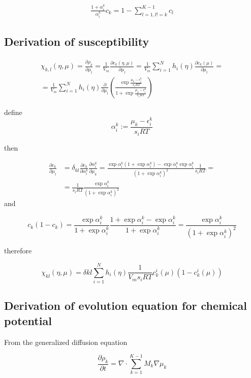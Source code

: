 \documentclass[11pt]{article}
\begin{document}
\begin{align*}
\frac{1+\alpha_i^k}{\alpha_i^k} c_k = 1-\sum_{l=1, l!=k}^{K-1} c_l
\end{align*}


\subsection{Derivation of susceptibility}
\label{sec:orga844052}

\begin{align*}
\chi_{k,l}(\eta, \mu) = \frac{\partial \rho_k}{\partial \mu_l} = \frac{1}{V_m} \frac{\partial c_k(\eta, \mu)}{\partial \mu_l} = \frac{1}{V_m} \sum_{i=1}^N h_i(\eta) \frac{\partial c_k(\mu)}{\partial \mu_l} = \\
 = \frac{1}{V_m} \sum_{i=1}^N h_i(\eta) \frac{\partial}{\partial \mu_l}\left( \frac{\exp{\frac{\mu_k - \epsilon^k_i}{s_i R T}}}{1 + \exp{\frac{\mu_k - \epsilon^k_i}{s_i R T}}} \right)
\end{align*}

define
$$
\alpha^k_i := \frac{\mu_k - \epsilon^k_i}{s_i R T}
$$

then

\begin{align*}
\frac{\partial c_k}{\partial \mu_l} &= \delta_{kl} \frac{\partial c_k}{\partial \alpha_i^k} \frac{\partial \alpha_i^k}{\partial \mu_k} = \frac{\exp{\alpha^k_i} (1+\exp{\alpha^k_i}) - \exp{\alpha^k_i} \exp{\alpha^k_i}}{(1+\exp{\alpha^k_i})^2} \frac{1}{s_i R T} = \\
&= \frac{1}{s_i R T} \frac{\exp{\alpha^k_i}}{(1+\exp{\alpha^k_i})^2}
\end{align*}
and

$$
c_k (1-c_k) = \frac{\exp{\alpha^k_i}}{1+\exp{\alpha^k_i}} \frac{1+\exp{\alpha^k_i} - \exp{\alpha^k_i}}{1+\exp{\alpha^k_i}} = \frac{\exp{\alpha^k_i}}{(1+\exp{\alpha^k_i})^2}
$$

therefore

$$
\chi_{kl}(\eta, \mu) = \delta{kl} \sum_{i=1}^N h_i(\eta) \frac{1}{V_m s_i R T} c^i_k(\mu) (1-c^i_k(\mu))
$$




\subsection{Derivation of evolution equation for chemical potential}
\label{sec:orgb8d1e50}

From the generalized diffusion equation

$$
\frac{\partial \rho_k}{\partial t} = \nabla \cdot \sum_{k=1}^{K-1} M_k \nabla \mu_k
$$
\end{document}
